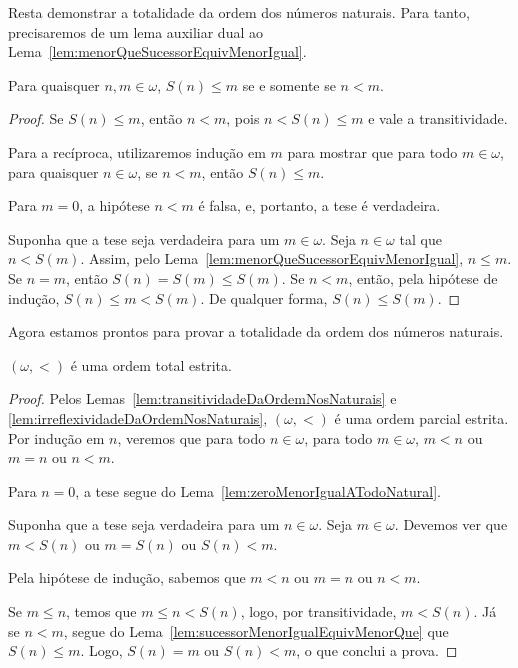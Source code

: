 Resta demonstrar a totalidade da ordem dos números naturais.
Para tanto, precisaremos de um lema auxiliar dual ao Lema~\ref{lem:menorQueSucessorEquivMenorIgual}.

\begin{lemma}[$Z^--P$]\label{lem:sucessorMenorIgualEquivMenorQue}
    Para quaisquer $n, m \in \omega$, $S(n) \leq m$ se e somente se $n < m$.
\end{lemma}
\begin{proof}
    Se $S(n)\leq m$, então $n<m$, pois $n<S(n)\leq m$ e vale a transitividade.

    Para a recíproca, utilizaremos indução em $m$ para mostrar que para todo $m \in \omega$, para quaisquer $n \in \omega$, se $n < m$, então $S(n) \leq m$.

    Para $m=0$, a hipótese $n < m$ é falsa, e, portanto, a tese é verdadeira.
    
    Suponha que a tese seja verdadeira para um $m \in \omega$.
    Seja $n \in \omega$ tal que $n < S(m)$.
    Assim, pelo Lema~\ref{lem:menorQueSucessorEquivMenorIgual}, $n \leq m$.
    Se $n=m$, então $S(n)=S(m)\leq S(m)$.
    Se $n<m$, então, pela hipótese de indução, $S(n) \leq m<S(m)$.
    De qualquer forma, $S(n) \leq S(m)$.
\end{proof}

Agora estamos prontos para provar a totalidade da ordem dos números naturais.
\begin{proposition}[$Z^--P$]\label{prop:ordemTotalEstritaNosNaturais}
    $(\omega, <)$ é uma ordem total estrita.
\end{proposition}
\begin{proof}
    Pelos Lemas~\ref{lem:transitividadeDaOrdemNosNaturais} e \ref{lem:irreflexividadeDaOrdemNosNaturais}, $(\omega, <)$ é uma ordem parcial estrita.
    Por indução em $n$, veremos que para todo $n \in \omega$, para todo $m \in \omega$, $m < n$ ou $m = n$ ou $n < m$.

    Para $n=0$, a tese segue do Lema~\ref{lem:zeroMenorIgualATodoNatural}.

    Suponha que a tese seja verdadeira para um $n \in \omega$.
    Seja $m \in \omega$.
    Devemos ver que $m < S(n)$ ou $m = S(n)$ ou $S(n) < m$.

    Pela hipótese de indução, sabemos que $m<n$ ou $m = n$ ou $n < m$.

    Se $m\leq n$, temos que $m\leq n<S(n)$, logo, por transitividade, $m<S(n)$.
    Já se $n<m$, segue do Lema~\ref{lem:sucessorMenorIgualEquivMenorQue} que $S(n)\le m$.
    Logo, $S(n)=m$ ou $S(n)<m$, o que conclui a prova.
\end{proof}

